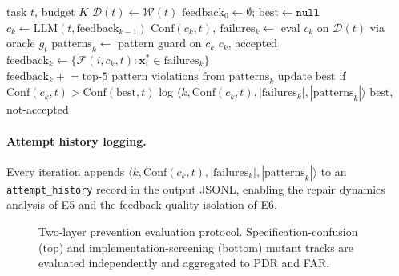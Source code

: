 \begin{algorithm}[t]
\caption{HSP-Agile (\textsc{SgDP} instantiation)}
\begin{algorithmic}[1]
\Require task $t$, budget $K$
\State $\mathcal{D}(t) \leftarrow \mathcal{W}(t)$ 
\State $\text{feedback}_0 \leftarrow \emptyset$; $\text{best} \leftarrow \mathtt{null}$
  \State $c_k \leftarrow \mathrm{LLM}(t, \text{feedback}_{k-1})$
  \State $\mathrm{Conf}(c_k,t),\ \text{failures}_k \leftarrow$ eval $c_k$ on $\mathcal{D}(t)$ via oracle $g_t$
  \State $\text{patterns}_k \leftarrow$ pattern guard on $c_k$
    \Return $c_k$, accepted
  \EndIf
  \State $\text{feedback}_k \leftarrow \{\mathcal{F}(i, c_k, t) : \mathbf{x}_i^* \in \text{failures}_k\}$
  \State $\text{feedback}_k \mathrel{+}= \text{top-}5 \text{ pattern violations from } \text{patterns}_k$
  \State update $\text{best}$ if $\mathrm{Conf}(c_k,t) > \mathrm{Conf}(\text{best},t)$
  \State log $\langle k, \mathrm{Conf}(c_k,t), |\text{failures}_k|, |\text{patterns}_k|\rangle$
\EndFor
\Return $\text{best}$, not-accepted 
\end{algorithmic}
\end{algorithm}

\paragraph{Attempt history logging.}
Every iteration appends $\langle k, \mathrm{Conf}(c_k,t), |\text{failures}_k|,
|\text{patterns}_k|\rangle$ to an \texttt{attempt\_history} record in the output JSONL,
enabling the repair dynamics analysis of E5 and the feedback quality isolation of E6.

\begin{figure}[t]
  \centering
  
  \caption{Two-layer prevention evaluation protocol.
    Specification-confusion (top) and implementation-screening (bottom)
    mutant tracks are evaluated independently and aggregated to PDR and FAR.}
  \label{fig:prevention-protocol}
\end{figure}


